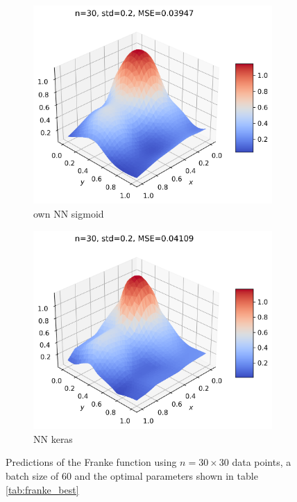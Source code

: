 \documentclass[11pt]{article}
\begin{document}
\begin{figure}[H]
\begin{subfigure}{.5\textwidth}
    \includegraphics[width=.92\textwidth]{../figures/NN_sigmoid_franke.png}
    \caption{own NN sigmoid}
    \label{fig:}
  \end{subfigure}
  \begin{subfigure}{.5\textwidth}
    \centering
    \includegraphics[width=.92\textwidth]{../figures/NN_tf_franke.png}
    \caption{NN keras}
    \label{fig:}
  \end{subfigure}
  \caption{Predictions of the Franke function using $n=30\times 30$ data points, a batch size of 60 and the optimal parameters shown in table \ref{tab:franke_best}}
  \label{fig:franke_pred}
\end{figure}
\end{document}
